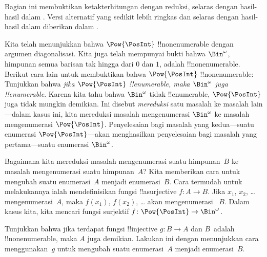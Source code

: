 \documentclass[../../../include/open-logic-section]{subfiles}
\begin{document}


\begin{editorial}
  Bagian ini membuktikan ketakterhitungan dengan reduksi, selaras dengan
  hasil-hasil dalam . Versi alternatif yang sedikit lebih
  ringkas dan selaras dengan hasil-hasil dalam  diberikan
  dalam .
\end{editorial}

Kita telah menunjukkan bahwa $\Pow{\PosInt}$ !!{nonenumerable} dengan argumen
diagonalisasi. Kita juga telah mempunyai bukti bahwa $\Bin^\omega$, himpunan
semua barisan tak hingga dari $0$ dan $1$, adalah !!{nonenumerable}. Berikut
cara lain untuk membuktikan bahwa $\Pow{\PosInt}$ !!{nonenumerable}:
Tunjukkan bahwa \emph{jika $\Pow{\PosInt}$ !!{enumerable}, maka $\Bin^\omega$
juga !!{enumerable}}. Karena kita tahu bahwa $\Bin^\omega$ tidak
!!{enumerable}, $\Pow{\PosInt}$ juga tidak mungkin demikian. Ini disebut
\emph{mereduksi} satu masalah ke masalah lain---dalam kasus ini, kita
mereduksi masalah mengenumerasi $\Bin^\omega$ ke masalah mengenumerasi
$\Pow{\PosInt}$. Penyelesaian bagi masalah yang kedua---suatu enumerasi
$\Pow{\PosInt}$---akan menghasilkan penyelesaian bagi masalah yang
pertama---suatu enumerasi $\Bin^\omega$.

Bagaimana kita mereduksi masalah mengenumerasi suatu himpunan~$B$ ke masalah
mengenumerasi suatu himpunan~$A$? Kita memberikan cara untuk mengubah suatu
enumerasi~$A$ menjadi enumerasi~$B$. Cara termudah untuk melakukannya ialah
mendefinisikan fungsi !!a{surjective} $f\colon A \to B$. Jika $x_1$, $x_2$,
\dots{} mengenumerasi~$A$, maka $f(x_1)$, $f(x_2)$, \dots{} akan mengenumerasi
~$B$. Dalam kasus kita, kita mencari fungsi surjektif $f\colon
\Pow{\PosInt} \to \Bin^\omega$.

\begin{prob}
Tunjukkan bahwa jika terdapat fungsi !!{injective} $g\colon B \to A$ dan
$B$~adalah !!{nonenumerable}, maka $A$ juga demikian. Lakukan ini
dengan menunjukkan cara menggunakan~$g$ untuk mengubah suatu enumerasi~$A$
menjadi enumerasi~$B$.
\end{prob}
\end{document}
